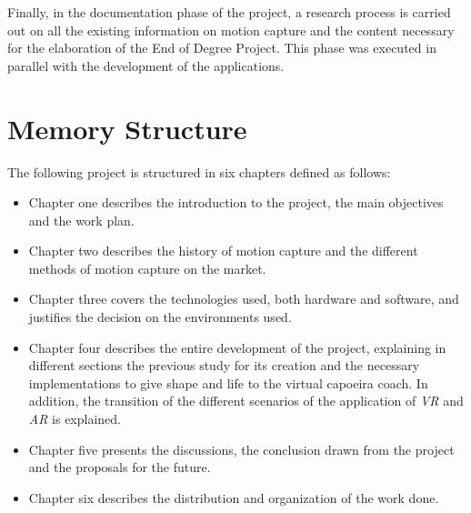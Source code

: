 Finally, in the documentation phase of the project, a research process is carried out on all the existing information on motion capture and the content necessary for the elaboration of the End of Degree Project. This phase was executed in parallel with the development of the applications.


\section{Memory Structure}


The following project is structured in six chapters defined as follows:

\begin{itemize}
    \item Chapter one describes the introduction to the project, the main objectives and the work plan.
    \item Chapter two describes the history of motion capture and the different methods of motion capture on the market.
    \item Chapter three covers the technologies used, both hardware and software, and justifies the decision on the environments used.
    \item Chapter four describes the entire development of the project, explaining in different sections the previous study for its creation and the necessary implementations to give shape and life to the virtual capoeira coach. In addition, the transition of the different scenarios of the application of \textit{VR} and \textit{AR} is explained.
    \item Chapter five presents the discussions, the conclusion drawn from the project and the proposals for the future.
    \item Chapter six describes the distribution and organization of the work done.
\end{itemize}
